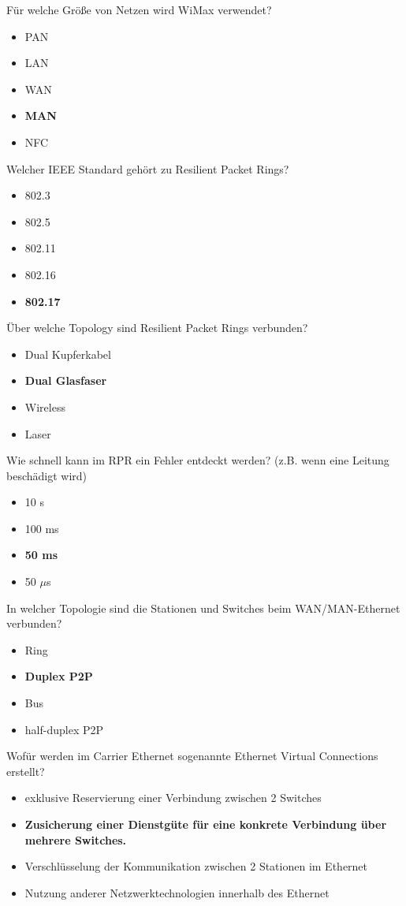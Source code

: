 \documentclass{article}
\begin{document}
	Für welche Größe von Netzen wird WiMax verwendet? 
	\begin{itemize}
		\item PAN
		\item LAN
		\item WAN
		\item \textbf{MAN}
		\item NFC
	\end{itemize}

	Welcher IEEE Standard gehört zu Resilient Packet Rings?
	\begin{itemize}
		\item 802.3
		\item 802.5
		\item 802.11
		\item 802.16
		\item \textbf{802.17}
	\end{itemize}

	Über welche Topology sind Resilient Packet Rings verbunden? 
	\begin{itemize}
		\item Dual Kupferkabel 
		\item \textbf{Dual Glasfaser }
		\item Wireless
		\item Laser
	\end{itemize}

	Wie schnell kann im RPR ein Fehler entdeckt werden? (z.B. wenn eine Leitung beschädigt wird)
	\begin{itemize}
		\item 10 s
		\item 100 ms
		\item \textbf{50 ms}
		\item 50 $\mu$s
	\end{itemize}

	In welcher Topologie sind die Stationen und Switches beim WAN/MAN-Ethernet verbunden?
	\begin{itemize}
		\item Ring
		\item \textbf{Duplex P2P}
		\item Bus
		\item half-duplex P2P
	\end{itemize}

	Wofür werden im Carrier Ethernet sogenannte Ethernet Virtual Connections erstellt?
	\begin{itemize}
		\item exklusive Reservierung einer Verbindung zwischen 2 Switches
		\item \textbf{Zusicherung einer Dienstgüte für eine konkrete Verbindung über mehrere Switches.}
		\item Verschlüsselung der Kommunikation zwischen 2 Stationen im Ethernet
		\item Nutzung anderer Netzwerktechnologien innerhalb des Ethernet 
	\end{itemize}
	
\end{document}
